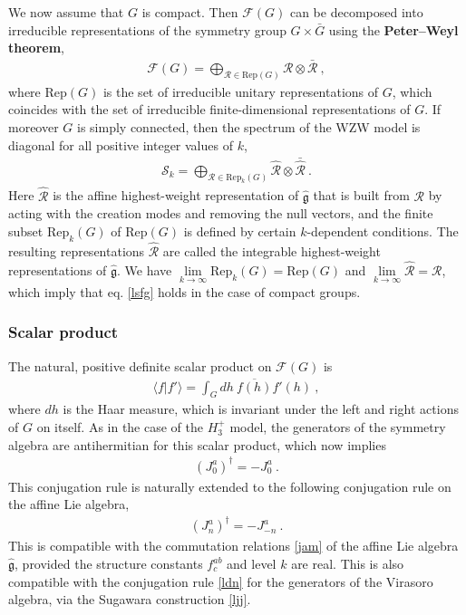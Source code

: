 \documentclass[12pt, a4paper, notitlepage, twoside]{report}
\numberwithin{equation}{section}
\theoremstyle{break}
\begin{document}
We now assume that $G$ is compact.
Then $\mathcal{F}(G)$ can be decomposed into irreducible representations of the symmetry group $G\times \bar{G}$ using the \textbf{\boldmath Peter--Weyl theorem}, 
\begin{align}
 \mathcal{F}(G) = \bigoplus_{\mathcal{R}\in \text{Rep}(G)} \mathcal{R}\otimes \bar{\mathcal{R}}\ ,
\end{align}
where $\text{Rep}(G)$ is the set of irreducible unitary representations of $G$, which coincides with the set of irreducible finite-dimensional representations of $G$.
If moreover $G$ is simply connected, then the spectrum of the WZW model is diagonal for all positive integer values of $k$, \cite{fms97}
\begin{align}
 \mathcal{S}_k = \bigoplus_{\mathcal{R}\in \text{Rep}_k(G)} \hat{\mathcal{R}}\otimes \bar{\hat{\mathcal{R}}}\ .
\end{align}
Here $\hat{\mathcal{R}}$ is the affine highest-weight representation of $\hat{\mathfrak{g}}$ that is built from $\mathcal{R}$ by acting with the creation modes and removing the null vectors, and the finite subset $\text{Rep}_k(G)$ of $\text{Rep}(G)$ is defined by certain $k$-dependent conditions.
The resulting representations $\hat{\mathcal{R}}$ are called the integrable highest-weight representations of $\hat{\mathfrak{g}}$. 
We have $\underset{k\to\infty}{\lim} \text{Rep}_k(G) =\text{Rep}(G)$ and $\underset{k\to \infty}{\lim} \hat{\mathcal{R}} = \mathcal{R}$, which imply that eq. \eqref{lsfg} holds in the case of compact groups.

\subsubsection{Scalar product}

The natural, positive definite scalar product on $\mathcal{F}(G)$ is 
\begin{align}
 \langle f|f'\rangle = \int_G dh\ \overline{f(h)} f'(h)\ ,
\label{gbg}
\end{align}
where $dh$ is the Haar measure, which is invariant under the left and right actions of $G$ on itself.
As in the case of the $H_3^+$ model, the generators of the symmetry algebra are antihermitian for this scalar product, which now implies
\begin{align}
 (J^a_0)^\dagger = -J^a_0\  . 
\label{jzdj}
\end{align}
This conjugation rule is naturally extended to the following conjugation rule on the affine Lie algebra,
\begin{align}
 \boxed{(J^a_n)^\dagger = -J^a_{-n}}\ .
\end{align}
This is compatible with the commutation relations \eqref{jam} of the affine Lie algebra $\hat{\mathfrak{g}}$, provided the structure constants $f^{ab}_c$ and level $k$ are real.
This is also compatible with the conjugation rule \eqref{ldn} for the generators of the Virasoro algebra, via the Sugawara construction \eqref{ljj}.
\end{document}
